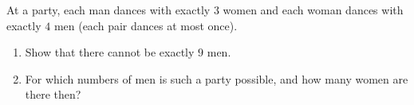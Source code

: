 At a party, each man dances with exactly $3$ women and each woman dances with exactly $4$ men (each pair dances at most once).
\begin{enumerate}
\item[(a)] Show that there cannot be exactly $9$ men.
\item[(b)] For which numbers of men is such a party possible, and how many women are there then?
\end{enumerate}
